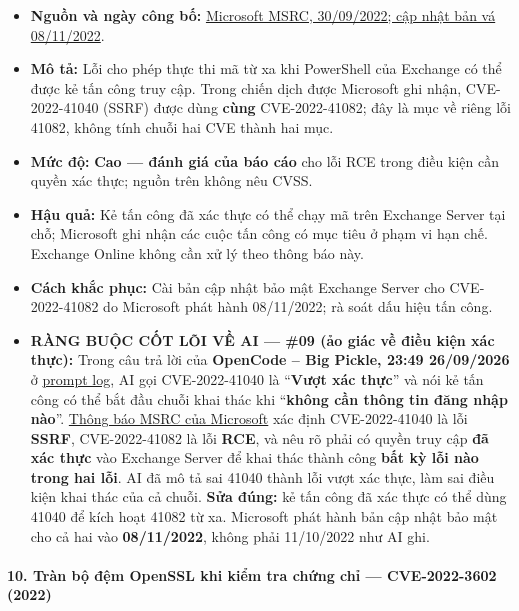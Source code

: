 \begin{itemize}
\tightlist
\item
  \textbf{Nguồn và ngày công bố:} \href{https://www.microsoft.com/en-us/msrc/blog/2022/09/customer-guidance-for-reported-zero-day-vulnerabilities-in-microsoft-exchange-server}{Microsoft MSRC, 30/09/2022; cập nhật bản vá 08/11/2022}.
\item
  \textbf{Mô tả:} Lỗi cho phép thực thi mã từ xa khi PowerShell của Exchange có thể được kẻ tấn công truy cập. Trong chiến dịch được Microsoft ghi nhận, CVE-2022-41040 (SSRF) được dùng \textbf{cùng} CVE-2022-41082; đây là mục về riêng lỗi 41082, không tính chuỗi hai CVE thành hai mục.
\item
  \textbf{Mức độ:} \textbf{Cao --- đánh giá của báo cáo} cho lỗi RCE trong điều kiện cần quyền xác thực; nguồn trên không nêu CVSS.
\item
  \textbf{Hậu quả:} Kẻ tấn công đã xác thực có thể chạy mã trên Exchange Server tại chỗ; Microsoft ghi nhận các cuộc tấn công có mục tiêu ở phạm vi hạn chế. Exchange Online không cần xử lý theo thông báo này.
\item
  \textbf{Cách khắc phục:} Cài bản cập nhật bảo mật Exchange Server cho CVE-2022-41082 do Microsoft phát hành 08/11/2022; rà soát dấu hiệu tấn công.
\item
  \textbf{RÀNG BUỘC CỐT LÕI VỀ AI --- \#09 (ảo giác về điều kiện xác thực):} Trong câu trả lời của \textbf{OpenCode -- Big Pickle, 23:49 26/09/2026} ở \href{Appendix_A_Prompt_Log.md}{prompt log}, AI gọi CVE-2022-41040 là ``\textbf{Vượt xác thực}'' và nói kẻ tấn công có thể bắt đầu chuỗi khai thác khi ``\textbf{không cần thông tin đăng nhập nào}''. \href{https://www.microsoft.com/en-us/msrc/blog/2022/09/customer-guidance-for-reported-zero-day-vulnerabilities-in-microsoft-exchange-server}{Thông báo MSRC của Microsoft} xác định CVE-2022-41040 là lỗi \textbf{SSRF}, CVE-2022-41082 là lỗi \textbf{RCE}, và nêu rõ phải có quyền truy cập \textbf{đã xác thực} vào Exchange Server để khai thác thành công \textbf{bất kỳ lỗi nào trong hai lỗi}. AI đã mô tả sai 41040 thành lỗi vượt xác thực, làm sai điều kiện khai thác của cả chuỗi. \textbf{Sửa đúng:} kẻ tấn công đã xác thực có thể dùng 41040 để kích hoạt 41082 từ xa. Microsoft phát hành bản cập nhật bảo mật cho cả hai vào \textbf{08/11/2022}, không phải 11/10/2022 như AI ghi.
\end{itemize}

\paragraph{10. Tràn bộ đệm OpenSSL khi kiểm tra chứng chỉ --- CVE-2022-3602 (2022)}\label{truxe0n-bux1ed9-ux111ux1ec7m-openssl-khi-kiux1ec3m-tra-chux1ee9ng-chux1ec9-cve-2022-3602-2022}

